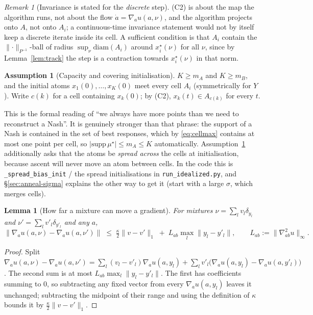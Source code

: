 \documentclass[11pt,a4paper]{article}
\theoremstyle{plain}
\newtheorem{lemma}[theorem]{Lemma}
\theoremstyle{definition}
\newtheorem{assumption}{Assumption}
\theoremstyle{remark}
\newtheorem{remark}[theorem]{Remark}
\newcommand{\norm}[1]{\lVert #1 \rVert}
\begin{document}
\begin{remark}[Invariance is stated for the \emph{discrete} step]
(C2) is about the map the algorithm runs, not about the flow $\dot a=\nabla_au(a,\nu)$,
and the algorithm projects onto $A$, not onto $A_i$; a continuous-time invariance
statement would not by itself keep a discrete iterate inside its cell. A sufficient
condition is that $A_i$ contain the $\norm{\cdot}_{P^{-1}}$-ball of radius
$\sup_\nu\mathrm{diam}(A_i)$ around $x_i^\star(\nu)$ for all $\nu$, since by
Lemma~\ref{lem:track} the step is a contraction towards $x_i^\star(\nu)$ in that norm.
\end{remark}

\begin{assumption}[Capacity and covering initialisation]\label{as:cover}
$K\ge m_A$ and $K\ge m_B$, and the initial atoms $x_1(0),\dots,x_K(0)$ meet every
cell $A_i$ (symmetrically for $Y$). Write $c(k)$ for a cell containing $x_k(0)$; by
(C2), $x_k(t)\in A_{c(k)}$ for every $t$.
\end{assumption}

This is the formal reading of ``we always have more points than we need to
reconstruct a Nash''. It is genuinely stronger than that phrase: the support of a
Nash is contained in the set of best responses, which by \eqref{eq:cellmax} contains
at most one point per cell, so $\lvert\mathrm{supp}\,\mu^\star\rvert \le m_A \le K$
automatically. Assumption~\ref{as:cover} additionally asks that the atoms be
\emph{spread across} the cells at initialisation, because ascent will never move an
atom between cells. In the code this is
\texttt{\_spread\_bias\_init} / the spread initialisations in
\texttt{run\_idealized.py}, and \S\ref{sec:anneal-sigma} explains the other way to
get it (start with a large $\sigma$, which merges cells).

\begin{lemma}[How far a mixture can move a gradient]\label{lem:grad}
For mixtures $\nu=\sum_lv_l\delta_{y_l}$ and $\nu'=\sum_lv'_l\delta_{y'_l}$ and any $a$,
\[
\norm{\nabla_a u(a,\nu)-\nabla_a u(a,\nu')}\;\le\;\tfrac{\kappa}{2}\norm{v-v'}_1
\;+\;L_{ab}\max_l\norm{y_l-y'_l},\qquad L_{ab}:=\norm{\nabla^2_{ab}u}_\infty .
\]
\end{lemma}
\begin{proof}
Split
$\nabla_au(a,\nu)-\nabla_au(a,\nu')=\sum_l(v_l-v'_l)\nabla_au(a,y_l)
+\sum_lv'_l\big(\nabla_au(a,y_l)-\nabla_au(a,y'_l)\big)$.
The second sum is at most $L_{ab}\max_l\norm{y_l-y'_l}$. The first has coefficients
summing to $0$, so subtracting any fixed vector from every $\nabla_au(a,y_l)$ leaves it
unchanged; subtracting the midpoint of their range and using the definition of $\kappa$
bounds it by $\tfrac{\kappa}{2}\norm{v-v'}_1$.
\end{proof}
\end{document}
